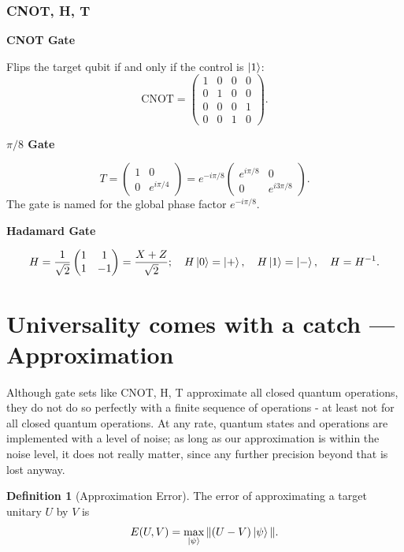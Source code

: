 \documentclass[12pt, a4paper, oneside]{report}
\theoremstyle{plain}
\theoremstyle{definition}
\newtheorem{definition}[theorem]{Definition}
\theoremstyle{remark}
\newcommand{\CNOT}{\mathrm{CNOT}}
\begin{document}
\subsubsection{CNOT, H, T}
\textbf{CNOT Gate}

Flips the target qubit if and only if the control is $\ket{1}$:
\[
	\CNOT = \begin{pmatrix}1&0&0&0\\0&1&0&0\\0&0&0&1\\0&0&1&0\end{pmatrix}.
\]

\textbf{\texorpdfstring{$\pi/8$}{pi/8} Gate}

\[
	T = \begin{pmatrix}1 & 0 \\ 0 & e^{i\pi/4}\end{pmatrix}
	= e^{-i\pi/8}\begin{pmatrix}e^{i\pi/8} & 0 \\ 0 & e^{i3\pi/8}\end{pmatrix}.
\]
The gate is named for the global phase factor $e^{-i\pi/8}$.

\textbf{Hadamard Gate}

\[
	H = \frac{1}{\sqrt{2}}\begin{pmatrix}1&1\\1&-1\end{pmatrix} = \frac{X+Z}{\sqrt{2}};\quad
	H\ket{0}=\ket{+},\quad H\ket{1}=\ket{-},\quad H=H^{-1}.
\]





\section{Universality comes with a catch ---Approximation}
Although gate sets like {CNOT, H, T} approximate all closed quantum operations, they do not do so perfectly with a finite sequence of operations - at least not for all closed quantum operations. At any rate, quantum states and operations are implemented with a level of noise; as long as our approximation is within the noise level, it does not really matter, since any further precision beyond that is lost anyway. 
\begin{definition}[Approximation Error]
	The error of approximating a target unitary $U$ by $V$ is
	\[
		E(U,V) = \max_{\ket{\psi}} \|(U-V)\ket{\psi}\|.
	\]
\end{definition}
\end{document}
